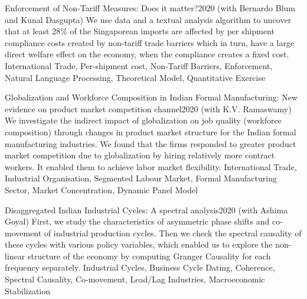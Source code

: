 %
%
%


\begin{projects}
	\project
	{Enforcement of Non-Tariff Measures: Does it matter?}{2020}
	{ (with Bernardo Blum and Kunal Dasgupta)}
	{We use data and a textual analysis algorithm to uncover that at least 28\% of the Singaporean imports are affected by per shipment compliance costs created by non-tariff trade barriers which in turn, have a large direct welfare effect on the economy, when the compliance creates a fixed cost.}
	{International Trade, Per-shipment cost, Non-Tariff Barriers, Enforcement, Natural Language Processing, Theoretical Model, Quantitative Exercise}
				
	\project
	{Globalization and Workforce Composition in Indian Formal Manufacturing:  New evidence on product market competition channel}{2020}
	{ (with K.V. Ramaswamy) \hfill {\color{accentcolor}{(Revise and Resubmit)}}}
	{We investigate the indirect impact of globalization on job quality (workforce composition) through changes in product market structure for the Indian formal manufacturing industries. We found that the firms responded to greater product market competition due to globalization by hiring relatively more contract workers. It enabled them to achieve labor market flexibility.}
	{International Trade, Industrial Organisation, Segmented Labour Market, Formal Manufacturing Sector, Market Concentration, Dynamic Panel Model}

	\project
	{Disaggregated Indian Industrial Cycles: A spectral analysis}{2020}
	{ (with Ashima Goyal) \hfill {\color{accentcolor}{(under review)}}}
	{First, we study the characteristics of asymmetric phase shifts and co-movement of industrial production cycles. Then we check the spectral causality of these cycles with various policy variables, which enabled us to explore the non-linear structure of the economy by computing Granger Causality for each frequency separately.}
	{Industrial Cycles, Business Cycle Dating, Coherence, Spectral Causality, Co-movement, Lead/Lag Industries, Macroeconomic Stabilization}

\end{projects}